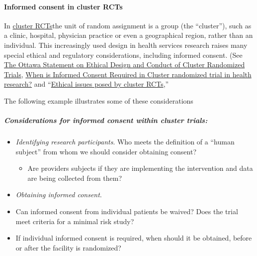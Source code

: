 \documentclass[]{book}
\providecommand{\tightlist}{%
  \setlength{\itemsep}{0pt}\setlength{\parskip}{0pt}}
\begin{document}
\paragraph{Informed consent in cluster
RCTs}\label{informed-consent-in-cluster-rcts}

In
\href{http://www.cochrane-net.org/openlearning/html/modA2-4.htm}{cluster
RCTs}the unit of random assignment is a group (the ``cluster''), such as
a clinic, hospital, physician practice or even a geographical region,
rather than an individual. This increasingly used design in health
services research raises many special ethical and regulatory
considerations, including informed consent. (See
\href{http://journals.plos.org/plosmedicine/article?id=10.1371/journal.pmed.1001346}{The
Ottawa Statement on Ethical Design and Conduct of Cluster Randomized
Trials},
\href{http://www.ncbi.nlm.nih.gov/pmc/articles/PMC3184061/pdf/1745-6215-12-202.pdf}{When
is Informed Consent Required in Cluster randomized trial in health
research?} and
``\href{http://trialsjournal.biomedcentral.com/articles/10.1186/1745-6215-12-100}{Ethical
issues posed by cluster RCTs},''

The following example illustrates some of these considerations

\subparagraph{Considerations for informed consent within cluster
trials:}\label{considerations-for-informed-consent-within-cluster-trials}

\begin{itemize}
\item
  \emph{Identifying research participants}. Who meets the definition of
  a ``human subject'' from whom we should consider obtaining consent?

  \begin{itemize}
  \tightlist
  \item
    Are providers subjects if they are implementing the intervention and
    data are being collected from them?
  \end{itemize}
\item
  \emph{Obtaining informed consent}.
\end{itemize}

\begin{itemize}
\item
  Can informed consent from individual patients be waived? Does the
  trial meet criteria for a minimal risk study?
\item
  If individual informed consent is required, when should it be
  obtained, before or after the facility is randomized?
\end{itemize}
\end{document}
